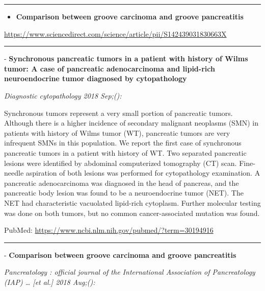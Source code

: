 \documentclass[]{article}
\providecommand{\tightlist}{%
  \setlength{\itemsep}{0pt}\setlength{\parskip}{0pt}}
\begin{document}
\begin{center}\rule{0.5\linewidth}{\linethickness}\end{center}

\begin{itemize}
\tightlist
\item
  \textbf{Comparison between groove carcinoma and groove pancreatitis}
\end{itemize}

\url{https://www.sciencedirect.com/science/article/pii/S142439031830663X}

\begin{center}\rule{0.5\linewidth}{\linethickness}\end{center}

 - \textbf{Synchronous pancreatic tumors in a patient with history of
Wilms tumor: A case of pancreatic adenocarcinoma and lipid-rich
neuroendocrine tumor diagnosed by cytopathology}

\emph{Diagnostic cytopathology 2018 Sep;():}

Synchronous tumors represent a very small portion of pancreatic tumors.
Although there is a higher incidence of secondary malignant neoplasms
(SMN) in patients with history of Wilms tumor (WT), pancreatic tumors
are very infrequent SMNs in this population. We report the first case of
synchronous pancreatic tumors in a patient with history of WT. Two
separated pancreatic lesions were identified by abdominal computerized
tomography (CT) scan. Fine-needle aspiration of both lesions was
performed for cytopathology examination. A pancreatic adenocarcinoma was
diagnosed in the head of pancreas, and the pancreatic body lesion was
found to be a neuroendocrine tumor (NET). The NET had characteristic
vacuolated lipid-rich cytoplasm. Further molecular testing was done on
both tumors, but no common cancer-associated mutation was found.

PubMed: \url{https://www.ncbi.nlm.nih.gov/pubmed/?term=30194916}

{}

{}

\begin{center}\rule{0.5\linewidth}{\linethickness}\end{center}

 - \textbf{Comparison between groove carcinoma and groove pancreatitis}

\emph{Pancreatology : official journal of the International Association
of Pancreatology (IAP) \ldots{} {[}et al.{]} 2018 Aug;():}
\end{document}
